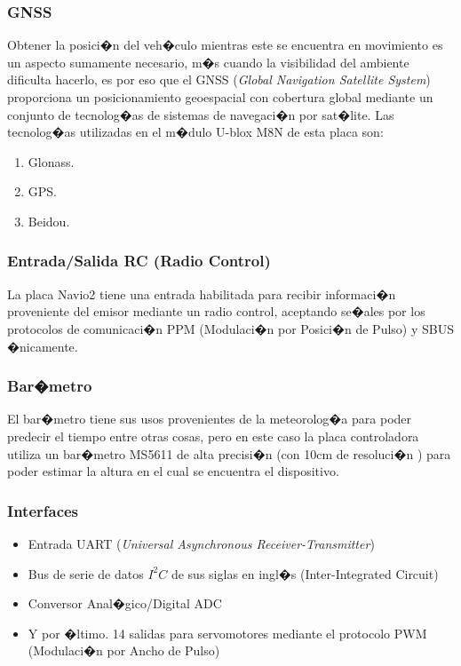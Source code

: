 	\subsubsection{GNSS}
		Obtener la posici�n del veh�culo mientras este se encuentra en movimiento es un aspecto sumamente necesario, m�s cuando la visibilidad del ambiente dificulta hacerlo, es por eso que el GNSS (\textit{Global Navigation Satellite System}) proporciona un posicionamiento geoespacial con cobertura global mediante un conjunto de tecnolog�as de sistemas de navegaci�n por sat�lite. Las tecnolog�as utilizadas en el m�dulo U-blox M8N de esta placa son:
		
		\begin{enumerate}
			\item Glonass.
			\item GPS.
			\item Beidou.
		\end{enumerate}


	\subsubsection{Entrada/Salida RC (Radio Control)} \label{sec:ioRC}
		La placa Navio2 tiene una entrada habilitada para recibir informaci�n proveniente del emisor mediante un radio control, aceptando se�ales por los protocolos de comunicaci�n PPM (Modulaci�n por Posici�n de Pulso) y SBUS �nicamente.
		

	\subsubsection{Bar�metro}
		El bar�metro tiene sus usos provenientes de la meteorolog�a para poder predecir el tiempo entre otras cosas, pero en este caso la placa controladora utiliza un bar�metro MS5611 de alta precisi�n (con 10cm de resoluci�n ) para poder estimar la altura en el cual se encuentra el dispositivo. 

	\subsubsection{Interfaces}
		\begin{itemize}
			\item Entrada UART (\textit{Universal Asynchronous Receiver-Transmitter})
			\item Bus de serie de datos $I^{2}C$ de sus siglas en ingl�s (Inter-Integrated Circuit)
			\item Conversor Anal�gico/Digital ADC
			\item Y por �ltimo. 14 salidas para servomotores mediante el protocolo PWM (Modulaci�n por Ancho de Pulso)
		\end{itemize}


